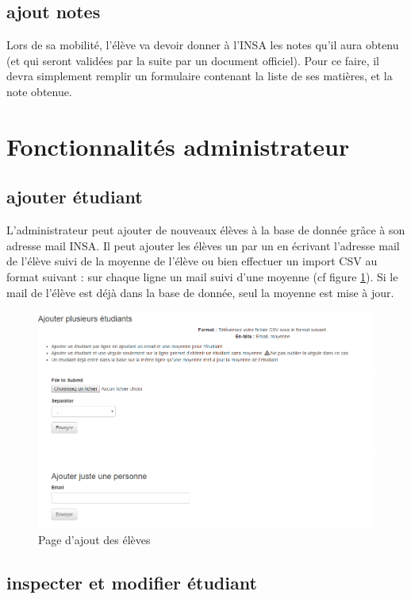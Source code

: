 \subsection{ajout notes}

Lors de sa mobilité, l'élève va devoir donner à l'INSA les notes qu'il aura obtenu (et qui seront validées par la suite par un document officiel). Pour ce faire, il devra simplement remplir un formulaire contenant la liste de ses matières, et la note obtenue.

\section{Fonctionnalités administrateur}

\subsection{ajouter étudiant}

L'administrateur peut ajouter de nouveaux élèves à la base de donnée grâce à son adresse mail INSA. Il peut ajouter les élèves un par un en écrivant l'adresse mail de l'élève suivi de la moyenne de l'élève ou bien effectuer un import CSV au format suivant : sur chaque ligne un mail suivi d'une moyenne (cf figure \ref{ae}).
\smallbreak
Si le mail de l'élève est déjà dans la base de donnée, seul la moyenne est mise à jour.

\begin{figure}[H]
	\centering
	\includegraphics[scale=0.35]{images/ae.png}
	\caption{Page d'ajout des élèves}
	\label{ae}
\end{figure}

\subsection{inspecter et modifier étudiant} 

